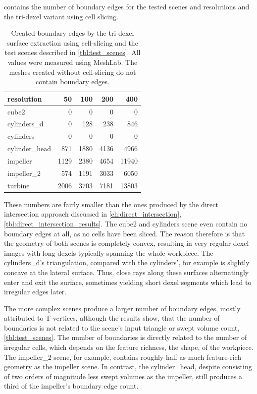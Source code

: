  contains the number of boundary edges for the tested scenes and resolutions and the tri-dexel variant using cell slicing.
%
\begin{table}
	\centering
	\begin{tabular}{l|r|r|r|r}
		resolution     &   50 &  100 &  200 &   400 \\
		\midrule
		cube2          &    0 &    0 &    0 &     0 \\
		cylinders\_d   &    0 &  128 &  238 &   846 \\
		cylinders      &    0 &    0 &    0 &     0 \\
		cylinder\_head &  871 & 1880 & 4136 &  4966 \\
		impeller       & 1129 & 2380 & 4654 & 11940 \\
		impeller\_2    &  574 & 1191 & 3033 &  6050 \\
		turbine        & 2006 & 3703 & 7181 & 13803 \\
	\end{tabular}
	\caption{
		Created boundary edges by the tri-dexel surface extraction using cell-slicing and the test scenes described in \cref{tbl:test_scenes}.
		All values were measured using MeshLab.
		The meshes created without cell-slicing do not contain boundary edges.
	}
	\label{tbl:tri_dexel_boundary edges}
\end{table}
%
These numbers are fairly smaller than the ones produced by the direct intersection approach discussed in \cref{ch:direct_intersection}, \cf \cref{tbl:direct_intersection_results}.
The cube2 and cylinders scene even contain no boundary edges at all, as no cells have been sliced.
The reason therefore is that the geometry of both scenes is completely convex, resulting in very regular dexel images with long dexels typically spanning the whole workpiece.
The cylinders\_d's triangulation, compared with the cylinders', for example is slightly concave at the lateral surface.
Thus, close rays along these surfaces alternatingly enter and exit the surface, sometimes yielding short dexel segments which lead to irregular edges later.

The more complex scenes produce a larger number of boundary edges, mostly attributed to T-vertices, although the results show, that the number of boundaries is not related to the scene's input triangle or swept volume count, \cf \cref{tbl:test_scenes}.
The number of boundaries is directly related to the number of irregular cells, which depends on the feature richness, \ie the shape, of the workpiece.
The impeller\_2 scene, for example, contains roughly half as much feature-rich geometry as the impeller scene.
In contrast, the cylinder\_head, despite consisting of two orders of magnitude less swept volumes as the impeller, still produces a third of the impeller's boundary edge count.

